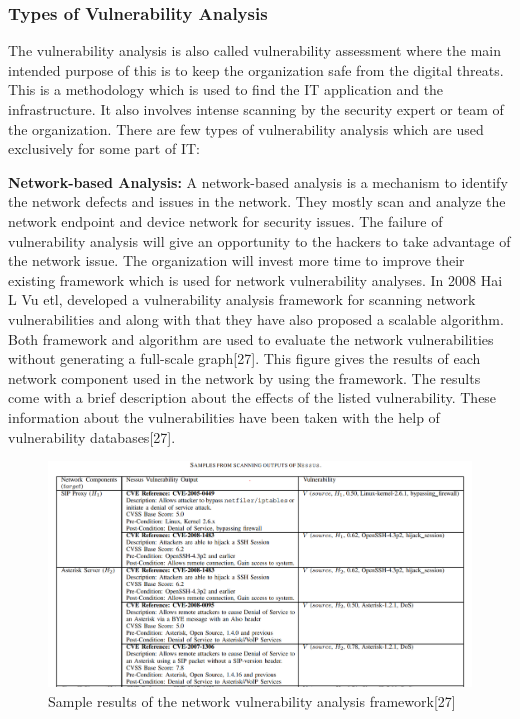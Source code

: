 \subsubsection{Types of Vulnerability Analysis}
The vulnerability analysis is also called vulnerability assessment where the main intended purpose of this is to keep the organization safe from the digital threats. This is a methodology which is used to find the IT application and the infrastructure. It also involves intense scanning by the security expert or team of the organization. There are few types of vulnerability analysis which are used exclusively for some part of IT:

{\bf Network-based Analysis:} A network-based analysis is a mechanism to identify the network defects and issues in the network. They mostly scan and analyze the network endpoint and device network for security issues. The failure of vulnerability analysis will give an opportunity to the hackers to take advantage of the network issue. The organization will invest more time to improve their existing framework which is used for network vulnerability analyses. In 2008 Hai L Vu etl, developed a vulnerability analysis framework for scanning network vulnerabilities and along with that they have also proposed a scalable algorithm. Both framework and algorithm are used to evaluate the network vulnerabilities without generating a full-scale graph[27]. This figure gives the results of each network component used in the network by using the framework. The results come with a brief description about the effects of the listed vulnerability. These information about the vulnerabilities have been taken with the help of vulnerability databases[27].

\begin{figure}[h!]
	\includegraphics[width=15cm]{includes/networkanalysis.png}
	\centering
	\caption{Sample results of the network vulnerability analysis framework[27]}
	\label{fig:networkanalysis}
\end{figure}

